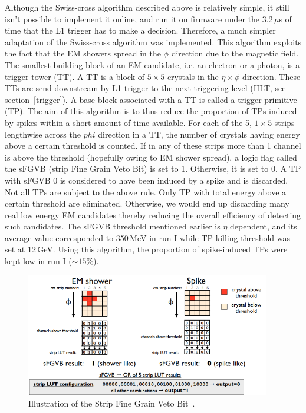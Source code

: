 Although the Swiss-cross algorithm described above is relatively simple, it still isn't possible to implement it online, and run it on firmware under the 3.2\,$\mu$s of time that the L1 trigger has to make a decision. Therefore, a much simpler adaptation of the Swiss-cross algorithm was implemented. This algorithm exploits the fact that the EM showers spread in the $\phi$ direction due to the magnetic field. The smallest building block of an EM candidate, i.e. an electron or a photon, is a trigger tower (TT). A TT is a block of $5\times5$ crystals in the $\eta\times\phi$ direction. These TTs are send downstream by L1 trigger to the next triggering level (HLT, see section~\ref{trigger}). A base block associated with a TT is called a trigger primitive (TP). The aim of this algorithm is to thus reduce the proportion of TPs induced by spikes within a short amount of time available. For each of the 5, $1\times5$ strips lengthwise across the $phi$ direction in a TT, the number of crystals  having energy above a certain threshold is counted. If in any of these strips more than 1 channel is above the threshold (hopefully owing to EM shower spread), a logic flag called the sFGVB (strip Fine Grain Veto Bit) is set to 1. Otherwise, it is set to 0. A TP with sFGVB 0 is considered to have been induced by a spike and is discarded. Not all TPs are subject to the above rule. Only TP with total energy above a certain threshold are eliminated. Otherwise, we would end up discarding many real low energy EM candidates thereby reducing the overall efficiency of detecting such candidates. The sFGVB threshold mentioned earlier is $\eta$ dependent, and its average value corresponded to 350\,MeV in run I while TP-killing threshold was set at 12\,GeV. Using this algorithm, the proportion of spike-induced TPs were kept low in run I ($\sim15\%$).      


\begin{figure}
\begin{center}
  \includegraphics[width=0.95\textwidth,keepaspectratio]{plots_and_figures/chapter3/sfgvb.png}
\caption{Illustration of the Strip Fine Grain Veto Bit~\cite{sfgvb}.}
\label{fig:swisscross}
\end{center}
\end{figure}

